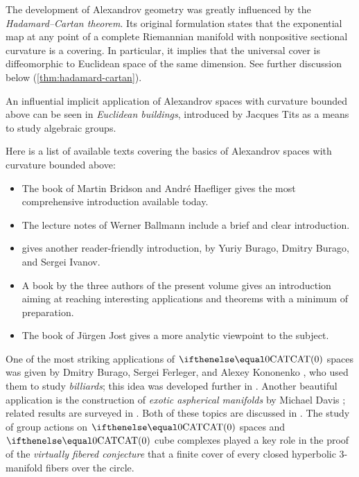 The development of Alexandrov geometry was greatly influenced by the {}\emph{Hadamard--Cartan theorem}.
Its original formulation states that the exponential map at any point of a complete Riemannian manifold with nonpositive sectional curvature is a covering.
In particular, it implies that the universal cover is diffeomorphic to Euclidean space of the same dimension. 
See further discussion below (\ref{thm:hadamard-cartan}).

An influential implicit application of Alexandrov spaces with curvature bounded above can be seen in {}\emph{Euclidean buildings}, introduced by Jacques Tits as a means to study algebraic groups.


Here is a list of available texts covering the basics of Alexandrov spaces with curvature bounded above: 
\begin{itemize}
\item The book of Martin Bridson and Andr\'e Haefliger \cite{bridson-haefliger} gives the most comprehensive introduction available today. 
\item The lecture notes of Werner Ballmann \cite{ballmann:lectures, ballmann:notes} include a brief 
and clear
introduction.
\item \cite[Chapter 9]{burago-burago-ivanov} gives another reader-friendly introduction, by Yuriy Burago, Dmitry Burago, and Sergei Ivanov.
\item A book  by the three authors of the present volume  \cite{alexander-kapovitch-petrunin-CAT} gives an introduction aiming at reaching interesting applications and theorems with a minimum of preparation.
\item The book of Jürgen Jost \cite{jost:book} gives a more analytic viewpoint to the subject.
\end{itemize}

One of the most striking applications of $\CAT0$ spaces was given by Dmitry Burago, Sergei Ferleger, and Alexey Kononenko \cite{burago-ferleger-kononenko1998-1},
who used them to study {}\emph{billiards}; this idea was developed further in \cite{burago-ferleger-kononenko1998-2,burago-ferleger-kononenko1998-3,burago-ferleger-kononenko1998-4,burago-ferleger-kononenko2000,burago-ferleger-kononenko2001}. 
Another beautiful application is the construction of {}\emph{exotic aspherical manifolds} by Michael Davis \cite{davis:aspherical}; related results are surveyed in \cite{davis:exotic,charney-davis-1995}.
Both of these topics are discussed in \cite{alexander-kapovitch-petrunin-CAT}.
The study of group actions on $\CAT 0$ spaces and $\CAT 0$ cube complexes played a key role in the proof of the {}\emph{virtually fibered conjecture} that a finite cover of  every closed hyperbolic 3-manifold fibers over the circle.

